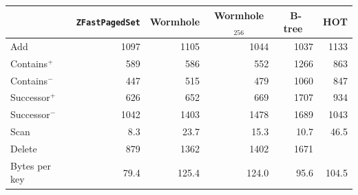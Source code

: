 \begin{tabular}{lrrrrr}
&\multicolumn{1}{c}{\texttt{ZFastPagedSet}}&\multicolumn{1}{c}{Wormhole}&\multicolumn{1}{c}{Wormhole$_{256}$}&\multicolumn{1}{c}{B-tree~\cite{Muller2025BTrees}}&\multicolumn{1}{c}{HOT}\\
\hline
Add & 1097 & 1105 & 1044 & 1037 & 1133\\
Contains$^+$ & 589 & 586 & 552 & 1266 & 863\\
Contains$^-$ & 447 & 515 & 479 & 1060 & 847\\
Successor$^+$ & 626 & 652 & 669 & 1707 & 934\\
Successor$^-$ & 1042 & 1403 & 1478 & 1689 & 1043\\
Scan & 8.3 & 23.7 & 15.3 & 10.7 & 46.5\\
Delete & 879 & 1362 & 1402 & 1671 & \\
\hline
Bytes per key & 79.4 & 125.4 & 124.0 & 95.6 & 104.5\\
\end{tabular}

